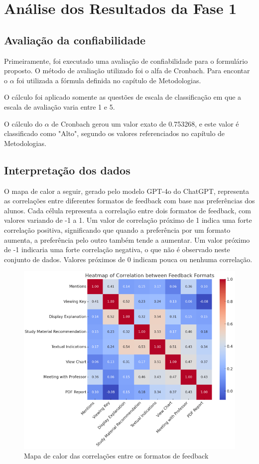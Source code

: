 \chapter{Análise dos Resultados da Fase 1}

\section{Avaliação da confiabilidade}

Primeiramente, foi executado uma avaliação de confiabilidade para o formulário proposto. O método de avaliação utilizado foi o alfa de Cronbach. Para encontar o $\alpha$ foi utilizada a fórmula definida no capítulo de Metodologias.

O cálculo foi aplicado somente as questões de escala de classificação em que a escala de avaliação varia entre 1 e 5.

O cálculo do $\alpha$ de Cronbach gerou um valor exato de 0.753268, e este valor é classificado como "Alto", segundo os valores referenciados no capítulo de Metodologias. 

\section{Interpretação dos dados}

O mapa de calor a seguir, gerado pelo modelo GPT-4o do ChatGPT, representa as correlações entre diferentes formatos de feedback com base nas preferências dos alunos. Cada célula representa a correlação entre dois formatos de feedback, com valores variando de -1 a 1. Um valor de correlação próximo de 1 indica uma forte correlação positiva, significando que quando a preferência por um formato aumenta, a preferência pelo outro também tende a aumentar. Um valor próximo de -1 indicaria uma forte correlação negativa, o que não é observado neste conjunto de dados. Valores próximos de 0 indicam pouca ou nenhuma correlação.

\begin{figure}[H]
\centering
\includegraphics{figuras/heatmapfeedback.png}
\caption{Mapa de calor das correlações entre os formatos de feedback}
\end{figure}


